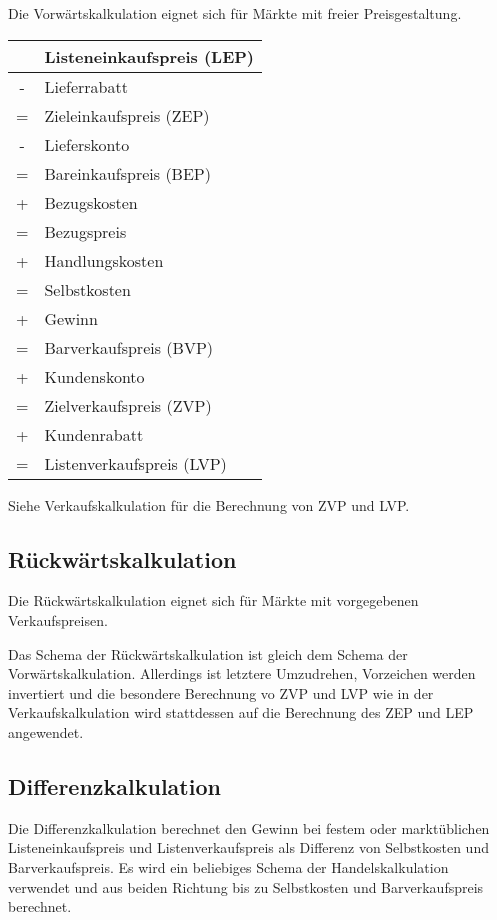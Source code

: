 Die Vorwärtskalkulation eignet sich für Märkte mit freier Preisgestaltung.

\begin{table}
    [H]
    \begin{tabular}{c|l}
          & Listeneinkaufspreis (LEP) \\
        \hline
        - & Lieferrabatt              \\
        \hline
        = & Zieleinkaufspreis (ZEP)   \\
        \hline
        - & Lieferskonto              \\
        \hline
        = & Bareinkaufspreis (BEP)    \\
        \hline
        + & Bezugskosten              \\
        \hline
        = & Bezugspreis               \\
        \hline
        + & Handlungskosten           \\
        \hline
        = & Selbstkosten              \\
        \hline
        + & Gewinn                    \\
        \hline
        = & Barverkaufspreis (BVP)    \\
        \hline
        + & Kundenskonto              \\
        \hline
        = & Zielverkaufspreis (ZVP)   \\
        \hline
        + & Kundenrabatt              \\
        \hline
        = & Listenverkaufspreis (LVP) \\
    \end{tabular}
    \label{tab:vorwaertskalkulation}
\end{table}

Siehe Verkaufskalkulation für die Berechnung von ZVP und LVP.

\subsection{Rückwärtskalkulation}

Die Rückwärtskalkulation eignet sich für Märkte mit vorgegebenen Verkaufspreisen.

Das Schema der Rückwärtskalkulation ist gleich dem Schema der Vorwärtskalkulation. Allerdings ist letztere Umzudrehen, Vorzeichen werden invertiert und die besondere Berechnung vo ZVP und LVP wie in der Verkaufskalkulation wird stattdessen auf die Berechnung des ZEP und LEP angewendet.

\subsection{Differenzkalkulation}

Die Differenzkalkulation berechnet den Gewinn bei festem oder marktüblichen Listeneinkaufspreis und Listenverkaufspreis als Differenz von Selbstkosten und Barverkaufspreis. Es wird ein beliebiges Schema der Handelskalkulation verwendet und aus beiden Richtung bis zu Selbstkosten und Barverkaufspreis berechnet.